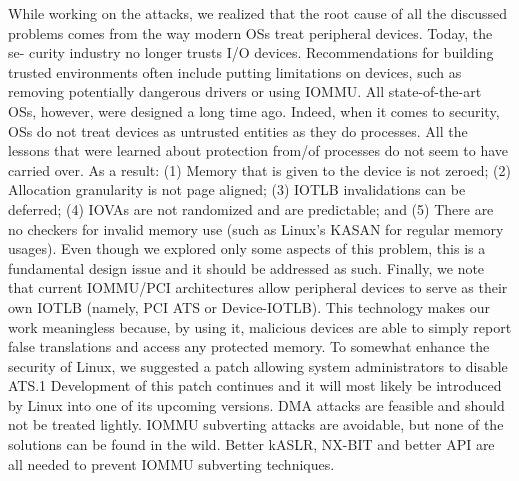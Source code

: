 While working on the attacks, we realized that the root cause of all the discussed problems comes from the way modern OSs treat peripheral devices. Today, the se- curity industry no longer trusts I/O devices. Recommendations for building trusted environments often include putting limitations on devices, such as removing potentially dangerous drivers or using IOMMU. All state-of-the-art OSs, however, were designed a long time ago. Indeed, when it comes to security, OSs do not treat devices as untrusted entities as they do processes. All the lessons that were learned about protection from/of processes do not seem to have carried over. As a result: (1) Memory that is given to the device is not zeroed; (2) Allocation granularity is not page aligned; (3) IOTLB invalidations can be deferred; (4) IOVAs are not randomized and are predictable; and (5) There are no checkers for invalid memory use (such as Linux’s KASAN for regular memory usages). Even though we explored only some aspects of this problem, this is a fundamental design issue and it should be addressed as such. Finally, we note that current IOMMU/PCI architectures allow peripheral devices to serve as their own IOTLB (namely, PCI ATS or Device-IOTLB). This technology makes our work meaningless because, by using it, malicious devices are able to simply report false translations and access any protected memory. To somewhat enhance the security of Linux, we suggested a patch allowing system administrators to disable ATS.1 Development of this patch continues and it will most likely be introduced by Linux into one of its upcoming versions.\newline
DMA attacks are feasible and should not be treated lightly. IOMMU subverting attacks are avoidable, but none of the solutions can be found in the wild. Better kASLR, NX-BIT and better API are all needed to prevent IOMMU subverting techniques. 